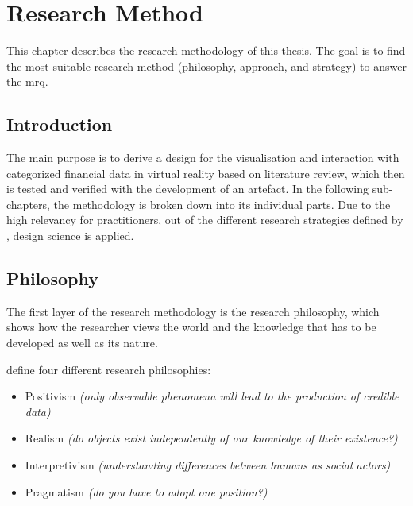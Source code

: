 
\chapter{Research Method}

\label{Research Method}

This chapter describes the research methodology of this thesis. The goal is to find the most suitable research method (philosophy, approach, and strategy) to answer the \gls{mrq}.



\section{Introduction}

The main purpose is to derive a design for the visualisation and interaction with categorized financial data in virtual reality based on literature review, which then is tested and verified with the development of an artefact. In the following sub-chapters, the methodology is broken down into its individual parts. Due to the high relevancy for practitioners, out of the different research strategies defined by \cite{Hevner2010}, design science is applied.


\section{Philosophy}

The first layer of the research methodology is the research philosophy, which shows how the researcher views the world and the knowledge that has to be developed as well as its nature.

\cite{Saunders2009} define four different research philosophies:
\begin{itemize}[noitemsep,nolistsep]
	\item Positivism \textit{(only observable phenomena will lead to the production of credible data)}
	\item Realism \textit{(do objects exist independently of our knowledge of their existence?)}
	\item Interpretivism \textit{(understanding differences between humans as social actors)}
	\item Pragmatism \textit{(do you have to adopt one position?)}
\end{itemize}

